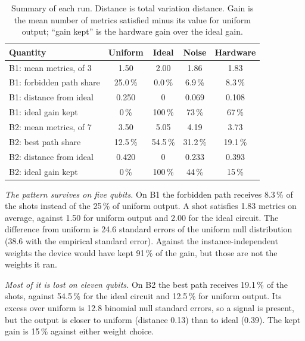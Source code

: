 \documentclass[journal]{IEEEtran}
\begin{document}
\begin{table}[t]
\caption{Summary of each run. Distance is total variation distance. Gain is the mean number of metrics satisfied minus its value for uniform output; ``gain kept'' is the hardware gain over the ideal gain.}
\label{tab:summary}
\centering
\footnotesize
\begin{tabular}{lcccc}
\hline \hline
\textbf{Quantity} & \textbf{Uniform} & \textbf{Ideal} & \textbf{Noise} & \textbf{Hardware} \\
\hline
B1: mean metrics, of 3 & 1.50 & 2.00 & 1.86 & 1.83 \\
B1: forbidden path share & 25.0\,\% & 0.0\,\% & 6.9\,\% & 8.3\,\% \\
B1: distance from ideal & 0.250 & 0 & 0.069 & 0.108 \\
B1: ideal gain kept & 0\,\% & 100\,\% & 73\,\% & 67\,\% \\
B2: mean metrics, of 7 & 3.50 & 5.05 & 4.19 & 3.73 \\
B2: best path share & 12.5\,\% & 54.5\,\% & 31.2\,\% & 19.1\,\% \\
B2: distance from ideal & 0.420 & 0 & 0.233 & 0.393 \\
B2: ideal gain kept & 0\,\% & 100\,\% & 44\,\% & 15\,\% \\
\hline \hline
\end{tabular}
\end{table}

\emph{The pattern survives on five qubits.} On B1 the forbidden path receives 8.3\,\% of the shots instead of the 25\,\% of uniform output. A shot satisfies 1.83 metrics on average, against 1.50 for uniform output and 2.00 for the ideal circuit. The difference from uniform is 24.6 standard errors of the uniform null distribution (38.6 with the empirical standard error). Against the instance-independent weights the device would have kept 91\,\% of the gain, but those are not the weights it ran.

\emph{Most of it is lost on eleven qubits.} On B2 the best path receives 19.1\,\% of the shots, against 54.5\,\% for the ideal circuit and 12.5\,\% for uniform output. Its excess over uniform is 12.8 binomial null standard errors, so a signal is present, but the output is closer to uniform (distance 0.13) than to ideal (0.39). The kept gain is 15\,\% against either weight choice.
\end{document}
